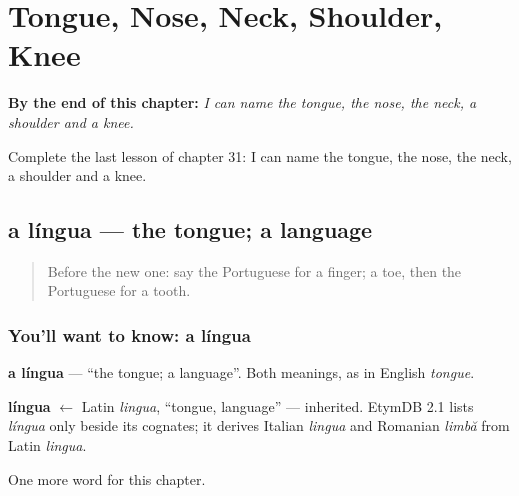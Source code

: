
\chapter{Tongue, Nose, Neck, Shoulder, Knee}
\label{ch:pt-tongue-nose-neck-shoulder-knee}

\begin{chapteropening}
\textbf{By the end of this chapter:} \emph{I can name the tongue, the nose, the neck, a shoulder and a knee.}

Complete the last lesson of chapter 31: I can name the tongue, the nose, the neck, a shoulder and a knee.
\end{chapteropening}

\section[a língua]{a língua — the tongue; a language}

\label{lesson:PT-C31-lingua}



\begin{quote}
Before the new one: say the Portuguese for a finger; a toe, then the Portuguese for a tooth.
\end{quote}

\subsection*{You'll want to know: a língua}
\textbf{a língua} — \textquotedblleft{}the tongue; a language\textquotedblright{}. Both meanings, as in English \emph{tongue}.

\begin{cousinweb}
\textbf{língua} $\leftarrow$ Latin \emph{lingua}, \textquotedblleft{}tongue, language\textquotedblright{} — inherited. EtymDB 2.1 lists \emph{língua} only beside its cognates; it derives Italian \emph{lingua} and Romanian \emph{limbă} from Latin \emph{lingua}.
\end{cousinweb}

\begin{grammarlens}[title={What you've built}]
One more word for this chapter.
\end{grammarlens}

